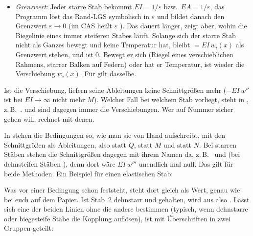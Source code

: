 \begin{itemize}
        (siehe unten), sie stehen in $i$, $i$ und $i$ aus dem
        Schnittgrößen-Export.
  \item \emph{Grenzwert}: Jeder starre Stab bekommt $EI = 1/\varepsilon$ bzw.\ $EA =
        1/\varepsilon$, das Programm löst das Rand-LGS symbolisch in $\varepsilon$ und bildet danach
        den Grenzwert $\varepsilon \to 0$ (im CAS heißt $\varepsilon$ ). Das dauert
        länger, zeigt aber, wohin die Biegelinie eines immer steiferen Stabes läuft. Solange sich
        der starre Stab nicht als Ganzes bewegt und keine Temperatur hat, bleibt 
        $= EI\,w_i(x)$ als Grenzwert stehen, und  ist $0$. Bewegt
        er sich (Riegel eines verschieblichen Rahmens, starrer Balken auf Federn) oder hat er
        Temperatur, ist  wieder die Verschiebung $w_i(x)$. Für  gilt
        dasselbe.
\end{itemize}

Ist  die Verschiebung, liefern seine Ableitungen keine Schnittgrößen mehr ($-EI\,w''$
ist bei $EI \to \infty$ nicht mehr $M$). Welcher Fall bei welchem Stab vorliegt, steht in
, z.\,B.\ .  und  sind
dagegen immer die Verschiebungen. Wer auf Nummer sicher gehen will, rechnet mit denen.

In  stehen die Bedingungen so, wie man sie von Hand aufschreibt, mit den
Schnittgrößen als Ableitungen, also  statt $Q$,  statt $M$ und
 statt $N$. Bei starren Stäben stehen die Schnittgrößen dagegen mit ihrem Namen da,
z.\,B.\  und  (bei dehnsteifen
Stäben ), denn dort wäre $EI\,w'''$ unendlich mal null. Das gilt für beide
Methoden. Ein Beispiel für einen elastischen Stab:

\begin{center}
\code{[\textquotedbl{}w1(x1=0)=0\textquotedbl{};\textquotedbl{}EIw1''(x1=0)=0\textquotedbl{};\textquotedbl{}w1(x1=l)=w2(x2=0)\textquotedbl{};\dots]}
\end{center}

Was vor einer Bedingung schon feststeht, steht dort gleich als Wert, genau wie bei euch auf dem
Papier. Ist Stab~2 dehnstarr und gehalten, wird aus  also
. Lässt sich eine der beiden Linien ohne die andere bestimmen (typisch,
wenn dehnstarre oder biegesteife Stäbe die Kopplung auflösen), ist  mit
Überschriften in zwei Gruppen geteilt:

